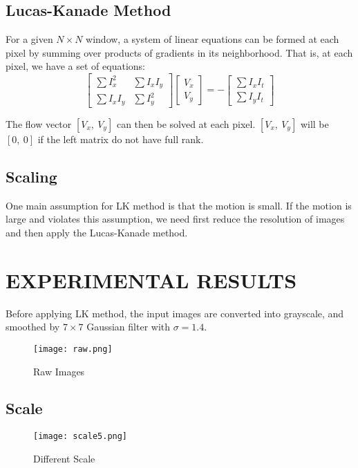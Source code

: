 \documentclass[letterpaper, 10 pt, conference]{ieeeconf}
\begin{document}
\subsection{Lucas-Kanade Method}
For a given $N\times N$ window, a system of linear equations can be formed at each pixel by summing over products of gradients in its neighborhood. That is, at each pixel, we have a set of equations:
\begin{equation}
\left[ \begin{array}{cc}
\sum I^2_x & \sum I_xI_y\\
\sum I_xI_y & \sum I^2_y
\end{array} \right] \left[ \begin{array}{c}
V_x\\
V_y
\end{array} \right]= -\left[ \begin{array}{c}
\sum I_xI_t\\
\sum I_yI_t
\end{array} \right]
\end{equation}

The flow vector $[V_x, \ V_y]$ can then be solved at each pixel. $[V_x, \ V_y]$ will be $[0, \ 0]$ if the left matrix do not have full rank.


\subsection{Scaling}
One main assumption for LK method is that the motion is small. If the motion is large and violates this assumption, we need first reduce the resolution of images and then apply the Lucas-Kanade method.
\section{EXPERIMENTAL RESULTS}
Before applying LK method, the input images are converted into grayscale, and smoothed by $7\times7$ Gaussian filter with $\sigma = 1.4$.
\begin{figure}[thpb]
\centering
\texttt{[image: raw.png]}
\caption{Raw Images}
\label{mosaic}
\end{figure}

\subsection{Scale}

\begin{figure}[thpb]
\centering
\texttt{[image: scale5.png]}
\caption{Different Scale}
\label{scale}
\end{figure}
\end{document}
